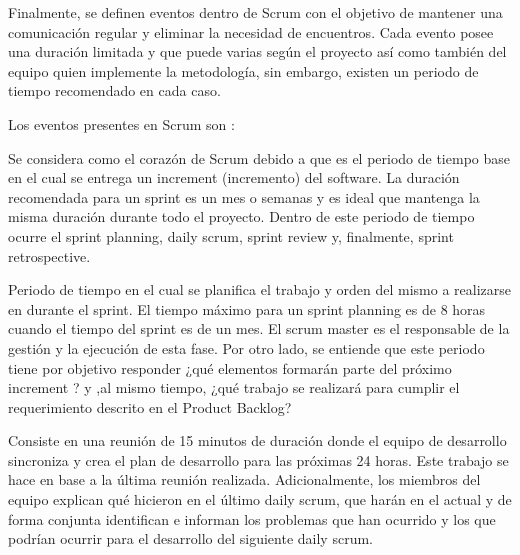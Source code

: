 Finalmente, se definen eventos dentro de Scrum con el objetivo de mantener una comunicación regular y eliminar la necesidad de encuentros. Cada evento posee una duración limitada y que puede varias según el proyecto así como también del equipo quien implemente la metodología, sin embargo, existen un periodo de tiempo recomendado en cada caso.

Los eventos presentes en Scrum son \cite{scrum_guide}:

\begin{description}[leftmargin=10em,style=nextline]
  \item[1. \textit{Sprint}] Se considera como el corazón de Scrum debido a que es el periodo de tiempo base en el cual se entrega un increment (incremento) del software. La duración recomendada para un sprint es un mes o semanas y es ideal que mantenga la misma duración durante todo el proyecto. Dentro de este periodo de tiempo ocurre el sprint planning, daily scrum, sprint review y, finalmente, sprint retrospective.
  \item[2. \textit{Sprint Planning}] Periodo de tiempo en el cual se planifica el trabajo y orden del mismo a realizarse en durante el sprint. El tiempo máximo para un sprint planning es de 8 horas cuando el tiempo del sprint es de un mes. El scrum master es el responsable de la gestión y la ejecución de esta fase. Por otro lado, se entiende que este periodo tiene por objetivo responder ¿qué elementos formarán parte del próximo increment ? y ,al mismo tiempo, ¿qué trabajo se realizará para cumplir el requerimiento descrito en el Product Backlog?

  \item[3. \textit{Dialy Scrum}] Consiste en una reunión de 15 minutos de duración donde el equipo de desarrollo sincroniza y crea el plan de desarrollo para las próximas 24 horas. Este trabajo se hace en base a la última reunión realizada. Adicionalmente, los miembros del equipo explican qué hicieron en el último daily scrum, que harán en el actual y de forma conjunta identifican e informan los problemas que han ocurrido y los que podrían ocurrir para el desarrollo del siguiente daily scrum.


\end{description}
